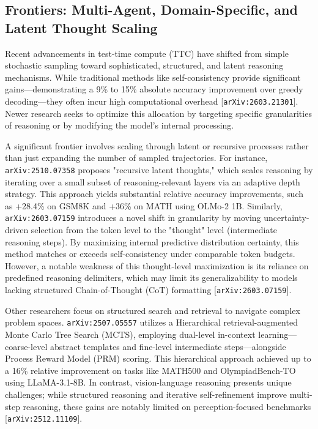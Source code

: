 \documentclass[11pt]{article}
\begin{document}
\subsection{Frontiers: Multi-Agent, Domain-Specific, and Latent Thought Scaling}

Recent advancements in test-time compute (TTC) have shifted from simple stochastic sampling toward sophisticated, structured, and latent reasoning mechanisms. While traditional methods like self-consistency provide significant gains—demonstrating a 9\% to 15\% absolute accuracy improvement over greedy decoding—they often incur high computational overhead [\texttt{arXiv:2603.21301}]. Newer research seeks to optimize this allocation by targeting specific granularities of reasoning or by modifying the model's internal processing.

A significant frontier involves scaling through latent or recursive processes rather than just expanding the number of sampled trajectories. For instance, \texttt{arXiv:2510.07358} proposes "recursive latent thoughts," which scales reasoning by iterating over a small subset of reasoning-relevant layers via an adaptive depth strategy. This approach yields substantial relative accuracy improvements, such as +28.4\% on GSM8K and +36\% on MATH using OLMo-2 1B. Similarly, \texttt{arXiv:2603.07159} introduces a novel shift in granularity by moving uncertainty-driven selection from the token level to the "thought" level (intermediate reasoning steps). By maximizing internal predictive distribution certainty, this method matches or exceeds self-consistency under comparable token budgets. However, a notable weakness of this thought-level maximization is its reliance on predefined reasoning delimiters, which may limit its generalizability to models lacking structured Chain-of-Thought (CoT) formatting [\texttt{arXiv:2603.07159}].

Other researchers focus on structured search and retrieval to navigate complex problem spaces. \texttt{arXiv:2507.05557} utilizes a Hierarchical retrieval-augmented Monte Carlo Tree Search (MCTS), employing dual-level in-context learning—coarse-level abstract templates and fine-level intermediate steps—alongside Process Reward Model (PRM) scoring. This hierarchical approach achieved up to a 16\% relative improvement on tasks like MATH500 and OlympiadBench-TO using LLaMA-3.1-8B. In contrast, vision-language reasoning presents unique challenges; while structured reasoning and iterative self-refinement improve multi-step reasoning, these gains are notably limited on perception-focused benchmarks [\texttt{arXiv:2512.11109}].
\end{document}
